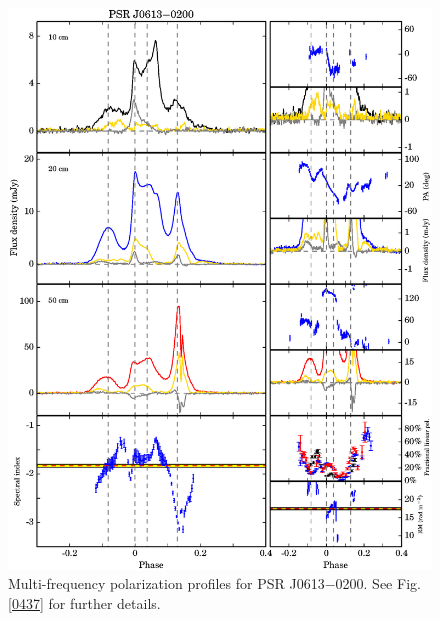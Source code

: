 \documentclass[useAMS,usenatbib]{mn2e}
\begin{document}
\begin{appendices}
\begin{figure}
\begin{center}
\includegraphics[width=6 in]{0613.ps}
\caption{Multi-frequency polarization profiles for PSR J0613$-$0200. 
See Fig. \ref{0437} for further details.}
\label{0613}
\end{center}
\end{figure}


\end{appendices}
\end{document}
